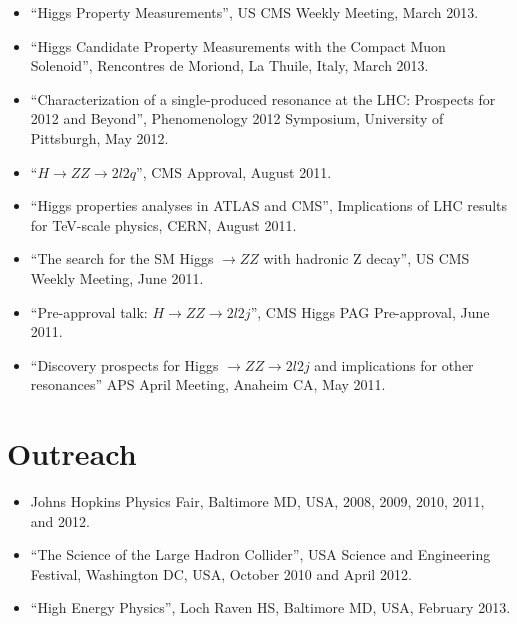 \documentclass[12pt,oneside,final]{thesis}
\begin{document}
\begin{vita}
\begin{itemize}
\item ``Higgs Property Measurements'', US CMS Weekly Meeting, March 2013.

\item ``Higgs Candidate Property Measurements with the Compact Muon Solenoid'', Rencontres de Moriond, La Thuile, Italy, March 2013.

\item ``Characterization of a single-produced resonance at the LHC: Prospects for 2012 and Beyond'', Phenomenology 2012 Symposium, University of Pittsburgh, May 2012.

\item ``$H \to ZZ \to 2l2q$'', CMS Approval, August 2011.

\item ``Higgs properties analyses in ATLAS and CMS'', Implications of LHC results for TeV-scale physics, CERN,  August 2011.

\item ``The search for the SM Higgs $\to ZZ$ with hadronic Z decay'', US CMS Weekly Meeting, June 2011.

\item ``Pre-approval talk: $H \to ZZ \to 2l 2j$'', CMS Higgs PAG Pre-approval, June 2011.

\item ``Discovery prospects for Higgs $\to ZZ \to 2l2j$ and implications for other resonances'' APS April Meeting, Anaheim CA, May 2011.

\end{itemize}

\section*{Outreach}

\begin{itemize}
\item Johns Hopkins Physics Fair, Baltimore MD, USA, 2008, 2009, 2010, 2011, and 2012.
\item ``The Science of the Large Hadron Collider'', USA Science and Engineering Festival, Washington DC, USA, October 2010 and April 2012.
\item ``High Energy Physics'', Loch Raven HS, Baltimore MD, USA, February 2013.
\end{itemize}

\end{vita}
\end{document}
